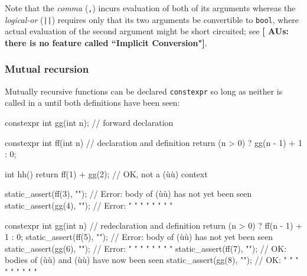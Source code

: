 \noindent Note that the \emph{comma} (\lstinline!,!) 
incurs evaluation of both of its arguments whereas the \emph{logical-or}
(\lstinline!||!)  requires only that its two arguments be
convertible to \lstinline!bool!, where actual evaluation of the second
argument might be short circuited; see \featureref{}{}\textbf{[ AUs: there is no feature called ``Implicit Conversion"]}.

\subsubsection[Mutual recursion]{Mutual recursion}\label{mutual-recursion}

Mutually recursive functions can be declared \lstinline!constexpr! so long
as neither is called in a  until both
definitions have been seen:

\begin{emcppslisting}
constexpr int gg(int n);       // forward declaration

constexpr int ff(int n)        // declaration and definition
{
    return (n > 0) ? gg(n - 1) + 1 : 0;
}

int hh()
{
    return ff(1) + gg(2);  // OK, not a (ù{}ù) context
}

static_assert(ff(3), "");      // Error: body of (ù{}ù) has not yet been seen
static_assert(gg(4), "");      // Error:  "   "   "    "   "   "   "    "

constexpr int gg(int n)        // redeclaration and definition
{
    return (n > 0) ? ff(n - 1) + 1 : 0;
    static_assert(ff(5), "");  // Error: body of (ù{}ù) has not yet been seen
    static_assert(gg(6), "");  // Error:  "   "   "    "   "   "   "    "
}
static_assert(ff(7), "");      // OK: bodies of (ù{}ù) and (ù{}ù) have now been seen
static_assert(gg(8), "");      // OK:    "   "   "    "   "    "    "   "    "
\end{emcppslisting}
    

